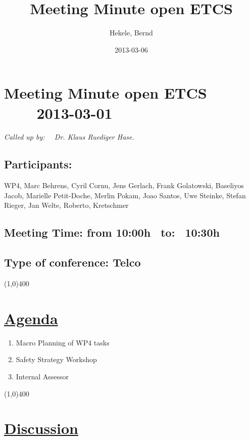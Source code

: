 \documentclass[a4paper]{article}
\title{Meeting Minute open ETCS}
\author{Hekele, Bernd}
\date{2013-03-06}
\begin{document}
\section*{\large{Meeting Minute open ETCS \ \ \ \ 2013-03-01}}

\large{\emph{Called up by: \ \  Dr. Klaus Ruediger Hase.}}

\subsection*{Participants:} WP4, Marc Behrens, Cyril Cornu, Jens Gerlach, Frank Golatowski, Baseliyos Jacob, Marielle Petit-Doche, Merlin Pokam, Joao Santos, Uwe Steinke, Stefan Rieger, Jan Welte, Roberto, Kretschmer\\

\subsection*{Meeting Time: from 10:00h \ to: \ 10:30h}

\subsection*{Type of conference: Telco}

\line(1,0){400}
\section*{\underline{Agenda}}
\begin{enumerate}
\item Macro Planning of WP4 tasks
\item Safety Strategy Workshop
\item Internal Assessor
\end{enumerate}
\line(1,0){400}
\section*{\underline{Discussion}}
\end{document}
